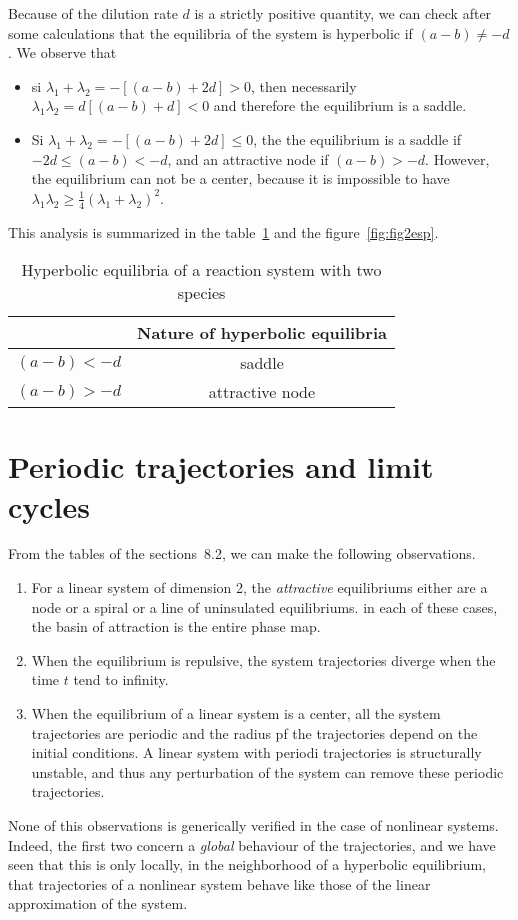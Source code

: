 {Because of the dilution rate $d$ is a strictly positive quantity, we can check after some calculations that the equilibria of the system is hyperbolic if $(a-b) \neq -d$. We observe that
\begin{itemize}
\item si $\lambda_1 + \lambda_2 = -[(a-b)+2d]>0$, then necessarily
$\lambda_1 \lambda_2 = d[(a-b)+d]<0$ and therefore the equilibrium is a saddle.
\item Si $\lambda_1 + \lambda_2 = -[(a-b)+2d]\leq 0$, the the equilibrium is a saddle
if $-2d\leq(a-b)<-d$, and an attractive node if $(a-b)>-d$.  However, the equilibrium can not be a center, because it is impossible to have
$\lambda_1 \lambda_2 \geq \frac{1}{4} (\lambda_1 + \lambda_2)^2$.
\end{itemize}
This analysis is summarized in the table~\ref{tab2esp} and the figure~\ref{fig:fig2esp}.

\begin{table}
\hspace*{10mm}
\renewcommand{\arraystretch}{3.0}
\begin{tabular}{|c|c|}
\hline
&
Nature of hyperbolic equilibria\\ \hline
$(a-b)<-d$&saddle \\ \hline
$(a-b)>-d$&attractive node\\ \hline
\end{tabular}
\caption{Hyperbolic equilibria of a reaction system with two species}
\label{tab2esp}
\end{table}

\section{Periodic trajectories and limit cycles}

From the tables of the sections~8.2, we can make the following observations.
\begin{enumerate}
\item For a linear system of dimension 2, the {\em attractive} equilibriums either are a node or a spiral or a line of uninsulated equilibriums. in
each of these cases, the basin of attraction is the entire phase map.
\item When the equilibrium is repulsive, the system trajectories diverge when the time $t$ tend to infinity.
\item When the equilibrium of a linear system is a center, all the system trajectories are periodic and the radius pf the trajectories depend on the initial conditions.
A linear system with periodi trajectories is structurally unstable, and thus any perturbation of the system can remove these periodic trajectories.
\end{enumerate}
None of this observations is generically verified in the case of nonlinear systems. Indeed, the first two concern a {\em global} behaviour of the trajectories, and we have seen that this is only locally, in the neighborhood of a hyperbolic equilibrium, that
trajectories of a nonlinear system behave like those of the linear approximation of the system.

}
